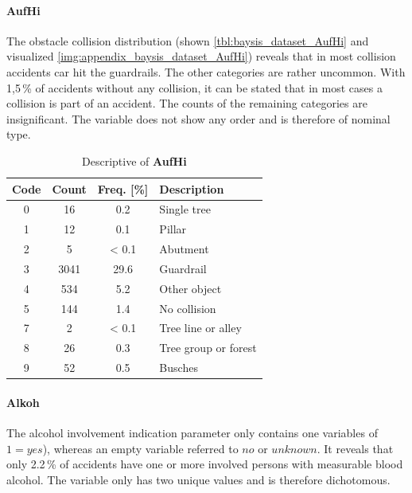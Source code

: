 \pagebreak

\paragraph{AufHi}
\label{baysis_dataset_AufHi}
The obstacle collision distribution (shown \autoref{tbl:baysis_dataset_AufHi} and visualized \autoref{img:appendix_baysis_dataset_AufHi}) reveals that in most collision accidents car hit the guardrails. The other categories are rather uncommon. With 1,5\,\% of accidents without any collision, it can be stated that in most cases a collision is part of an accident. The counts of the remaining categories are insignificant. The variable does not show any order and is therefore of nominal type.
\begin{table}[ht]
	\centering
	\small
	\begin{tabular}{c|c|c|l} 
		\toprule
		Code & Count & Freq. [\%] & Description \\ 
		\midrule 
		0 & 16 		& 0.2	& Single tree \\
		1 & 12 		& 0.1	& Pillar \\
		2 & 5 		& < 0.1	& Abutment \\
		3 & 3041	& 29.6	& Guardrail \\
		4 & 534		& 5.2	& Other object \\
		5 & 144		& 1.4	& No collision \\
		7 & 2		& < 0.1	& Tree line or alley \\
		8 & 26		& 0.3	& Tree group or forest \\
		9 & 52		& 0.5	& Busches \\
		\bottomrule
	\end{tabular}
	\caption{Descriptive of \textbf{AufHi}}
	\label{tbl:baysis_dataset_AufHi}
	\vspace{-8mm}
\end{table}

\paragraph{Alkoh}
\label{baysis_dataset_Alkoh}
The alcohol involvement indication parameter only contains one variables of $1 = yes$), whereas an empty variable referred to $no$ or $unknown$. It reveals that only 2.2\,\% of accidents have one or more involved persons with measurable blood alcohol. The variable only has two unique values and is therefore dichotomous.

